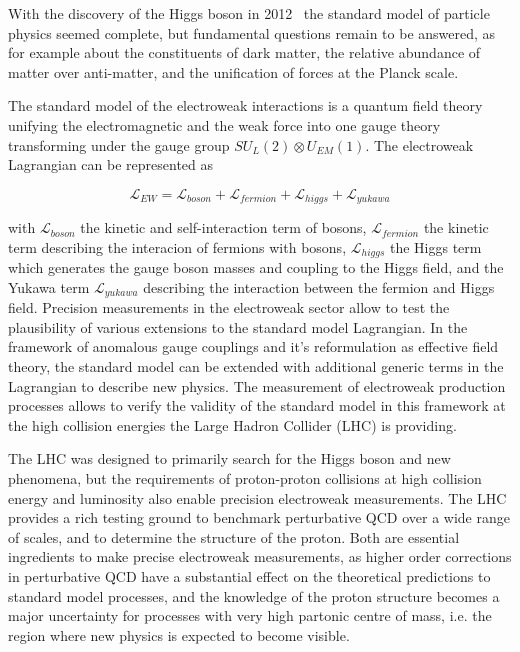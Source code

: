 \label{ss-intro-motivation}

With the discovery of the Higgs boson in 2012~\cite{Chatrchyan201230, Aad20121} 
the standard model of particle physics
seemed complete, but fundamental questions remain to be answered, as for example about the
constituents of dark matter, the relative abundance of matter over anti-matter, 
and the unification of forces at the Planck scale. 

The standard model of the electroweak interactions is a quantum field theory
unifying the electromagnetic and the weak force into one gauge theory transforming
under the gauge group $SU_L(2) \otimes U_{EM}(1)$. 
The electroweak Lagrangian can be represented as 

$$ \mathcal{L}_{EW} = \mathcal{L}_{boson} + \mathcal{L}_{fermion} + \mathcal{L}_{higgs} + \mathcal{L}_{yukawa} $$

with $\mathcal{L}_{boson}$ the kinetic and self-interaction term of bosons,
$\mathcal{L}_{fermion}$ the kinetic term describing the interacion of fermions
with bosons, $\mathcal{L}_{higgs}$ the Higgs term which generates the gauge boson masses
and coupling to the Higgs field, and the Yukawa term $\mathcal{L}_{yukawa}$ describing
the interaction between the fermion and Higgs field. 
Precision measurements in the electroweak sector allow to test the plausibility of 
various extensions to the standard model Lagrangian. In the framework of anomalous gauge couplings
and it's reformulation as effective field theory, the standard model can be extended
with additional generic terms in the Lagrangian to describe new physics. The 
measurement of electroweak production processes allows to verify the validity 
of the standard model in this framework at the high collision energies the Large Hadron Collider (LHC) 
is providing.

The LHC was designed to primarily search for the Higgs boson and
new phenomena, but the requirements of proton-proton collisions at high collision energy and 
luminosity also enable precision electroweak measurements. The LHC 
provides a rich testing ground to benchmark perturbative QCD over a wide range of scales, 
and to determine the structure of the proton. 
Both are essential ingredients to make precise electroweak measurements, as higher order
corrections in perturbative QCD have a substantial effect on the theoretical predictions to 
standard model processes, and the knowledge of the proton structure becomes a major uncertainty
for processes with very high partonic centre of mass, i.e. the region where new physics is expected
to become visible.


